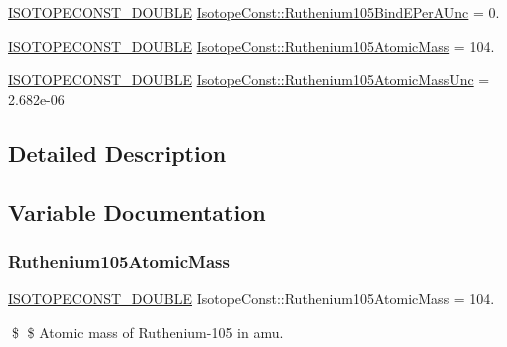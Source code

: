 \begin{DoxyCompactItemize}
\mbox{\hyperlink{group___isotope_const-_macros_ga8f45a7272ce02c0b4c65c44636ed719a}{I\+S\+O\+T\+O\+P\+E\+C\+O\+N\+S\+T\+\_\+\+D\+O\+U\+B\+LE}} \mbox{\hyperlink{group___isotope_const-_ruthenium-_ru105_gabdf76bd548b295bba159d7b2c60d3c12}{Isotope\+Const\+::\+Ruthenium105\+Bind\+E\+Per\+A\+Unc}} = 0.
\item 
\mbox{\hyperlink{group___isotope_const-_macros_ga8f45a7272ce02c0b4c65c44636ed719a}{I\+S\+O\+T\+O\+P\+E\+C\+O\+N\+S\+T\+\_\+\+D\+O\+U\+B\+LE}} \mbox{\hyperlink{group___isotope_const-_ruthenium-_ru105_ga5bcf1b9fb55ec826dc764406ea849603}{Isotope\+Const\+::\+Ruthenium105\+Atomic\+Mass}} = 104.
\item 
\mbox{\hyperlink{group___isotope_const-_macros_ga8f45a7272ce02c0b4c65c44636ed719a}{I\+S\+O\+T\+O\+P\+E\+C\+O\+N\+S\+T\+\_\+\+D\+O\+U\+B\+LE}} \mbox{\hyperlink{group___isotope_const-_ruthenium-_ru105_gaa842a8f37199a9f159e5c2f3577d9ffd}{Isotope\+Const\+::\+Ruthenium105\+Atomic\+Mass\+Unc}} = 2.\+682e-\/06
\end{DoxyCompactItemize}


\subsection{Detailed Description}


\subsection{Variable Documentation}
\mbox{\label{group___isotope_const-_ruthenium-_ru105_ga5bcf1b9fb55ec826dc764406ea849603}} 
\subsubsection{\texorpdfstring{Ruthenium105\+Atomic\+Mass}{Ruthenium105AtomicMass}}
{\footnotesize\ttfamily \mbox{\hyperlink{group___isotope_const-_macros_ga8f45a7272ce02c0b4c65c44636ed719a}{I\+S\+O\+T\+O\+P\+E\+C\+O\+N\+S\+T\+\_\+\+D\+O\+U\+B\+LE}} Isotope\+Const\+::\+Ruthenium105\+Atomic\+Mass = 104.}

\$ \$ Atomic mass of Ruthenium-\/105 in amu. \mbox{\label{group___isotope_const-_ruthenium-_ru105_gaa842a8f37199a9f159e5c2f3577d9ffd}} 
